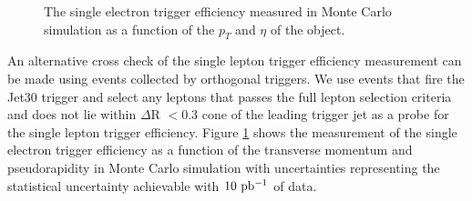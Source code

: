 \documentclass{cmspaper}
\begin{document}
\begin{figure}[htb]
  \begin{center}
    \caption{The single electron trigger efficiency measured in Monte Carlo simulation as a function of the $p_{T}$ and $\eta$ of the object. }
    \label{fig:SingleElectronTriggerEfficiency_TagAndProbeMethod}
  \end{center}
\end{figure}


An alternative cross check of the single lepton trigger efficiency measurement can be made using events collected by orthogonal triggers. We use events that fire the Jet30 trigger and select any leptons that passes the full lepton selection criteria and does not lie within $\Delta$R $< 0.3$ cone of the leading trigger jet as a probe for the single lepton trigger efficiency. Figure \ref{fig:SingleElectronTriggerEfficiency_TagAndProbeMethod} shows the measurement of the single electron trigger efficiency as a function of the transverse momentum and pseudorapidity in Monte Carlo simulation with uncertainties representing the statistical uncertainty achievable with $10\ \mathrm{pb^{-1}}$ of data.
\end{document}
